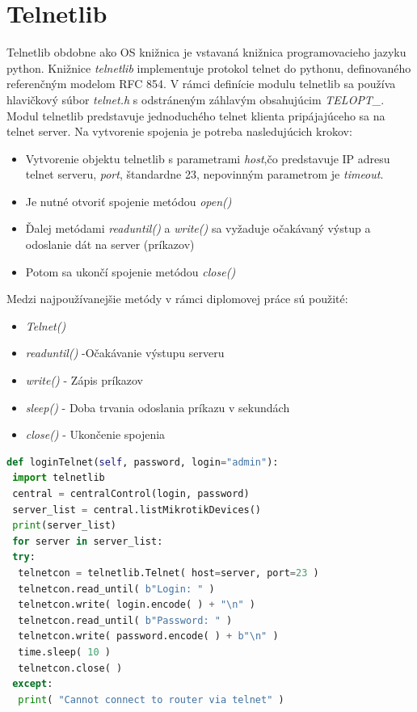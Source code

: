 \section{Telnetlib}
Telnetlib \cite{telnetlib} obdobne ako OS knižnica je vstavaná knižnica programovacieho jazyku python. Knižnice \textit{telnetlib} implementuje protokol telnet do pythonu, definovaného referenčným modelom RFC 854. V rámci definície modulu telnetlib sa používa hlavičkový súbor \textit{telnet.h} s odstráneným záhlavým obsahujúcim \textit{TELOPT\_}. \\Modul telnetlib predstavuje jednoduchého telnet klienta pripájajúceho sa na telnet server. Na vytvorenie spojenia je potreba nasledujúcich krokov:
\begin{itemize}
\item Vytvorenie objektu telnetlib s parametrami \textit{host},čo predstavuje IP adresu telnet serveru, \textit{port}, štandardne 23, nepovinným parametrom je \textit{timeout}. 
\item Je nutné otvoriť spojenie metódou \textit{open()}
\item Ďalej metódami \textit{readuntil()} a \textit{write()} sa vyžaduje očakávaný výstup a odoslanie dát na server (príkazov)
\item Potom sa ukončí spojenie metódou \textit{close()}
\end{itemize}
Medzi najpoužívanejšie metódy v rámci diplomovej práce sú použité:
\begin{itemize}
\item  \textit{Telnet()}
\item \textit{readuntil()} -Očakávanie výstupu serveru
\item \textit{write()} - Zápis príkazov
\item \textit{sleep()} - Doba trvania odoslania príkazu v sekundách
\item \textit{close()} - Ukončenie spojenia
\end{itemize}
\begin{lstlisting}[language=python, frame=single, caption=Použitie knižnice telnetlib, captionpos=b, showstringspaces=false, basicstyle=\footnotesize]
def loginTelnet(self, password, login="admin"):
 import telnetlib
 central = centralControl(login, password)
 server_list = central.listMikrotikDevices()
 print(server_list)
 for server in server_list:
 try:
  telnetcon = telnetlib.Telnet( host=server, port=23 )
  telnetcon.read_until( b"Login: " )
  telnetcon.write( login.encode( ) + "\n" )
  telnetcon.read_until( b"Password: " )
  telnetcon.write( password.encode( ) + b"\n" )
  time.sleep( 10 )
  telnetcon.close( )
 except:
  print( "Cannot connect to router via telnet" )
\end{lstlisting} 

